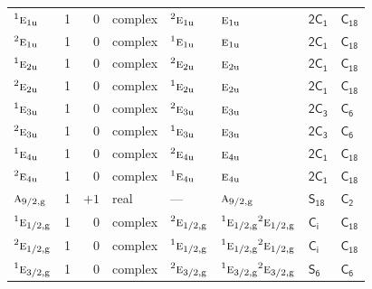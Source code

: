 \documentclass[10pt,a4paper]{article}
\makeatletter
\def\grouprule#1#2{\noalign{\marks\LTgroupmarks{\the\belowrulesep}\nobreak\vskip#1%
  \vskip\aboverulesep}\multispan\LT@cols\unskip{\leaders\hrule\@height#2\hfill\kern\z@}\cr
  \noalign{\penalty\LTrulebreak\vskip\belowrulesep\global\@lastruleclass\z@}}
\numberwithin{equation}{section}
\newcommand{\grp}[1]{\mathsf{#1}}
\newcommand{\irr}[1]{\text{\normalfont\scshape #1}}
\newcommand{\conjpair}[1]{{}^{#1}}
\newcommand{\ptag}[1]{\mathrm{#1}}
\makeatother
\begin{document}
{\begin{longtable}{@{}lrrlllll@{}}
$\conjpair{1}\irr{e}_{1\ptag{u}}$ & 1 & $0$ & complex & $\conjpair{2}\irr{e}_{1\ptag{u}}$ & $\irr{e}_{1\ptag{u}}$ & \href{2C1.pdf}{$\grp{2C_{1}}$} & $\grp{C_{18}}$\\
$\conjpair{2}\irr{e}_{1\ptag{u}}$ & 1 & $0$ & complex & $\conjpair{1}\irr{e}_{1\ptag{u}}$ & $\irr{e}_{1\ptag{u}}$ & \href{2C1.pdf}{$\grp{2C_{1}}$} & $\grp{C_{18}}$\\
$\conjpair{1}\irr{e}_{2\ptag{u}}$ & 1 & $0$ & complex & $\conjpair{2}\irr{e}_{2\ptag{u}}$ & $\irr{e}_{2\ptag{u}}$ & \href{2C1.pdf}{$\grp{2C_{1}}$} & $\grp{C_{18}}$\\
$\conjpair{2}\irr{e}_{2\ptag{u}}$ & 1 & $0$ & complex & $\conjpair{1}\irr{e}_{2\ptag{u}}$ & $\irr{e}_{2\ptag{u}}$ & \href{2C1.pdf}{$\grp{2C_{1}}$} & $\grp{C_{18}}$\\
$\conjpair{1}\irr{e}_{3\ptag{u}}$ & 1 & $0$ & complex & $\conjpair{2}\irr{e}_{3\ptag{u}}$ & $\irr{e}_{3\ptag{u}}$ & \href{2C3.pdf}{$\grp{2C_{3}}$} & \href{../../../rotation/data/pdf/C6.pdf}{$\grp{C_{6}}$}\\
$\conjpair{2}\irr{e}_{3\ptag{u}}$ & 1 & $0$ & complex & $\conjpair{1}\irr{e}_{3\ptag{u}}$ & $\irr{e}_{3\ptag{u}}$ & \href{2C3.pdf}{$\grp{2C_{3}}$} & \href{../../../rotation/data/pdf/C6.pdf}{$\grp{C_{6}}$}\\
$\conjpair{1}\irr{e}_{4\ptag{u}}$ & 1 & $0$ & complex & $\conjpair{2}\irr{e}_{4\ptag{u}}$ & $\irr{e}_{4\ptag{u}}$ & \href{2C1.pdf}{$\grp{2C_{1}}$} & $\grp{C_{18}}$\\
$\conjpair{2}\irr{e}_{4\ptag{u}}$ & 1 & $0$ & complex & $\conjpair{1}\irr{e}_{4\ptag{u}}$ & $\irr{e}_{4\ptag{u}}$ & \href{2C1.pdf}{$\grp{2C_{1}}$} & $\grp{C_{18}}$\\
\grouprule{0pt}{\lightrulewidth}
$\irr{a}_{9/2,\ptag{g}}$ & 1 & $+1$ & real & --- & $\irr{a}_{9/2,\ptag{g}}$ & \href{S18.pdf}{$\grp{S_{18}}$} & \href{../../../rotation/data/pdf/C2.pdf}{$\grp{C_{2}}$}\\
$\conjpair{1}\irr{e}_{1/2,\ptag{g}}$ & 1 & $0$ & complex & $\conjpair{2}\irr{e}_{1/2,\ptag{g}}$ & $\conjpair{1}\irr{e}_{1/2,\ptag{g}}\conjpair{2}\irr{e}_{1/2,\ptag{g}}$ & \href{S2.pdf}{$\grp{C_{i}}$} & $\grp{C_{18}}$\\
$\conjpair{2}\irr{e}_{1/2,\ptag{g}}$ & 1 & $0$ & complex & $\conjpair{1}\irr{e}_{1/2,\ptag{g}}$ & $\conjpair{1}\irr{e}_{1/2,\ptag{g}}\conjpair{2}\irr{e}_{1/2,\ptag{g}}$ & \href{S2.pdf}{$\grp{C_{i}}$} & $\grp{C_{18}}$\\
$\conjpair{1}\irr{e}_{3/2,\ptag{g}}$ & 1 & $0$ & complex & $\conjpair{2}\irr{e}_{3/2,\ptag{g}}$ & $\conjpair{1}\irr{e}_{3/2,\ptag{g}}\conjpair{2}\irr{e}_{3/2,\ptag{g}}$ & \href{S6.pdf}{$\grp{S_{6}}$} & \href{../../../rotation/data/pdf/C6.pdf}{$\grp{C_{6}}$}\\

\end{longtable}}
\end{document}
